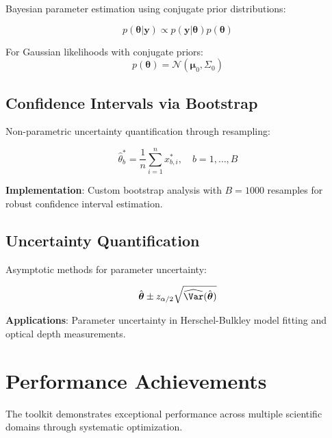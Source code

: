 \documentclass[11pt,a4paper]{article}
\begin{document}
Bayesian parameter estimation using conjugate prior distributions:

\begin{equation}
p(\boldsymbol{\theta}|\mathbf{y}) \propto p(\mathbf{y}|\boldsymbol{\theta}) p(\boldsymbol{\theta})
\label{eq:bayes_theorem}
\end{equation}

For Gaussian likelihoods with conjugate priors:
\begin{equation}
p(\boldsymbol{\theta}) = \mathcal{N}(\boldsymbol{\mu}_0, \Sigma_0)
\label{eq:conjugate_prior}
\end{equation}

\subsection{Confidence Intervals via Bootstrap}
\label{subsec:bootstrap}

Non-parametric uncertainty quantification through resampling:

\begin{equation}
\hat{\theta}^*_b = \frac{1}{n} \sum_{i=1}^n x^*_{b,i}, \quad b = 1, \dots, B
\label{eq:bootstrap_estimate}
\end{equation}

\textbf{Implementation}: Custom bootstrap analysis with $B = 1000$ resamples for robust confidence interval estimation.

\subsection{Uncertainty Quantification}
\label{subsec:uncertainty}

Asymptotic methods for parameter uncertainty:

\begin{equation}
\hat{\boldsymbol{\theta}} \pm z_{\alpha/2} \sqrt{\widehat{\Var}(\hat{\boldsymbol{\theta}})}
\label{eq:asymptotic_ci}
\end{equation}

\textbf{Applications}: Parameter uncertainty in Herschel-Bulkley model fitting and optical depth measurements.

\section{Performance Achievements}
\label{sec:performance}

The toolkit demonstrates exceptional performance across multiple scientific domains through systematic optimization.
\end{document}
